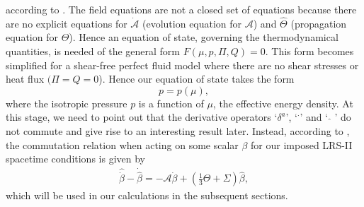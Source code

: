 \documentclass[abstract=on,notitlepage,superscriptaddress,nofootinbib,aps,showpacs,twocolumn,prd]{revtex4}
\newcommand{\0}{^{(0)}}
\newcommand{\1}{^{(1)}}
\newcommand{\2}{^{(2)}}
\newcommand{\3}{{}^{(3)}}
\begin{document}
according to \cite{clarkson2007}. The field equations are not a closed set of equations because there are no explicit equations for $\dot{\mathcal{A}}$ (evolution equation for $\mathcal{A}$) and $\hat{\Theta}$ (propagation equation for $\Theta$). Hence  an equation of state, governing the thermodynamical quantities, is needed of the general form $F(\mu,p,\Pi,Q)=0$. This form becomes simplified for a shear-free perfect fluid model where there are no shear stresses or heat flux $(\Pi = Q =0$). Hence our equation of state takes the form
 \begin{equation}
 p=p(\mu), \label{eos}
 \end{equation}
 where the isotropic pressure $p$ is a function of $\mu$, the effective energy density. At this stage, we need to point out that the derivative operators `$\delta^a$', `${^\cdot{}}$' and ` $\hat{}$ ' do not commute and give rise to an interesting result later. Instead, according to \cite{clarkson2007}, the commutation relation when acting on some scalar $\beta$ for our imposed LRS-II spacetime conditions is given by 
\begin{align}
     \hat{\dot{\beta}}-\dot{\hat{\beta}}=-\mathcal{A}\dot{\beta}+
     \left(\frac{1}{3}\Theta+\Sigma\right)\hat{\beta},\label{comm_reln}
\end{align}
which will be used in our calculations in the subsequent sections.

\end{document}
